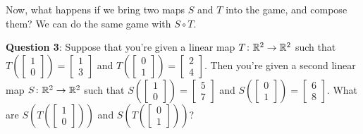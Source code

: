 Now, what happens if we bring two maps $S$ and $T$ into the game, and compose them?
We can do the same game with $S \circ T$.
\begin{itemize}
	\ii \textbf{Question 3}:
	Suppose that you're given a linear map $T \colon \mathbb R^2 \to \mathbb R^2$ such that
	$T\left( \left[ \begin{smallmatrix} 1 \\ 0 \end{smallmatrix} \right] \right)
	= \left[ \begin{smallmatrix} 1 \\ 3 \end{smallmatrix} \right]$
	and
	$T\left( \left[ \begin{smallmatrix} 0 \\ 1 \end{smallmatrix} \right] \right)
	= \left[ \begin{smallmatrix} 2 \\ 4 \end{smallmatrix} \right]$.
	Then you're given a second linear map $S \colon \mathbb R^2 \to \mathbb R^2$ such that
	$S\left( \left[ \begin{smallmatrix} 1 \\ 0 \end{smallmatrix} \right] \right)
	= \left[ \begin{smallmatrix} 5 \\ 7 \end{smallmatrix} \right]$
	and
	$S\left( \left[ \begin{smallmatrix} 0 \\ 1 \end{smallmatrix} \right] \right)
	= \left[ \begin{smallmatrix} 6 \\ 8 \end{smallmatrix} \right]$.
	What are
	$S\left( T\left( \left[ \begin{smallmatrix} 1 \\ 0 \end{smallmatrix} \right] \right) \right)$
	and
	$S\left( T\left( \left[ \begin{smallmatrix} 0 \\ 1 \end{smallmatrix} \right] \right) \right)$?


\end{itemize}
